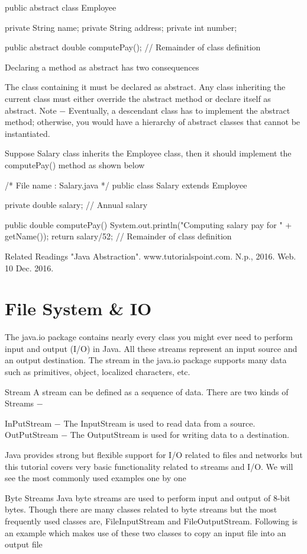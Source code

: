 public abstract class Employee {
   private String name;
   private String address;
   private int number;

   public abstract double computePay();
   // Remainder of class definition
}
Declaring a method as abstract has two consequences

The class containing it must be declared as abstract.
Any class inheriting the current class must either override the abstract method or declare itself as abstract.
Note − Eventually, a descendant class has to implement the abstract method; otherwise, you would have a hierarchy of abstract classes that cannot be instantiated.

Suppose Salary class inherits the Employee class, then it should implement the computePay() method as shown below

/* File name : Salary.java */
public class Salary extends Employee {
   private double salary;   // Annual salary

   public double computePay() {
      System.out.println("Computing salary pay for " + getName());
      return salary/52;
   }
   // Remainder of class definition
}
Related Readings
"Java Abstraction". www.tutorialspoint.com. N.p., 2016. Web. 10 Dec. 2016.

\chapter{File System & IO}

The java.io package contains nearly every class you might ever need to perform input and output (I/O) in Java. All these streams represent an input source and an output destination. The stream in the java.io package supports many data such as primitives, object, localized characters, etc.

Stream
A stream can be defined as a sequence of data. There are two kinds of Streams −

InPutStream − The InputStream is used to read data from a source.
OutPutStream − The OutputStream is used for writing data to a destination.


Java provides strong but flexible support for I/O related to files and networks but this tutorial covers very basic functionality related to streams and I/O. We will see the most commonly used examples one by one

Byte Streams
Java byte streams are used to perform input and output of 8-bit bytes. Though there are many classes related to byte streams but the most frequently used classes are, FileInputStream and FileOutputStream. Following is an example which makes use of these two classes to copy an input file into an output file

